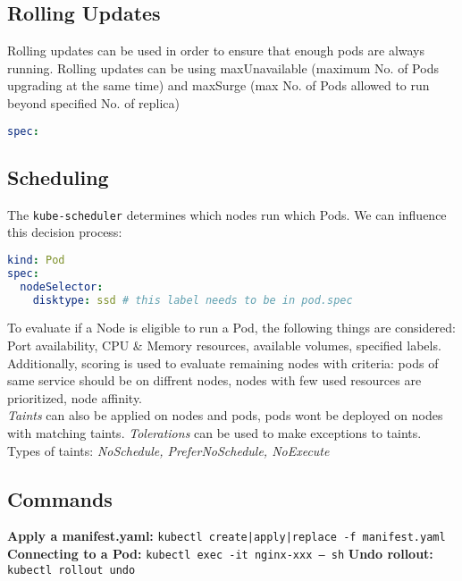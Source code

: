 
\subsection{Rolling Updates}
Rolling updates can be used in order to ensure that enough pods are always running.
Rolling updates can be using maxUnavailable (maximum No. of Pods upgrading at the same time) and maxSurge (max No. of Pods allowed to run beyond specified No. of replica)

\begin{lstlisting}[language=yaml]
spec:
\end{lstlisting}

\subsection{Scheduling}
The \texttt{kube-scheduler} determines which nodes run which Pods. We can influence this decision process:

\begin{lstlisting}[language=yaml]
kind: Pod
spec:
  nodeSelector:
    disktype: ssd # this label needs to be in pod.spec
\end{lstlisting}

To evaluate if a Node is eligible to run a Pod, the following things are considered: Port availability, CPU \& Memory resources, available volumes, specified labels. Additionally, scoring is used to evaluate remaining nodes with criteria: pods of same service should be on diffrent nodes, nodes with few used resources are prioritized, node affinity. \\
\textit{Taints} can also be applied on nodes and pods, pods wont be deployed on nodes with matching taints. \textit{Tolerations} can be used to make exceptions to taints. Types of taints: \textit{NoSchedule, PreferNoSchedule, NoExecute}


\subsection{Commands}
\textbf{Apply a manifest.yaml:} \texttt{kubectl {create|apply|replace} -f manifest.yaml} \\
\textbf{Connecting to a Pod:} \texttt{kubectl exec -it nginx-xxx -- sh}
\textbf{Undo rollout:} \texttt{kubectl rollout undo}
